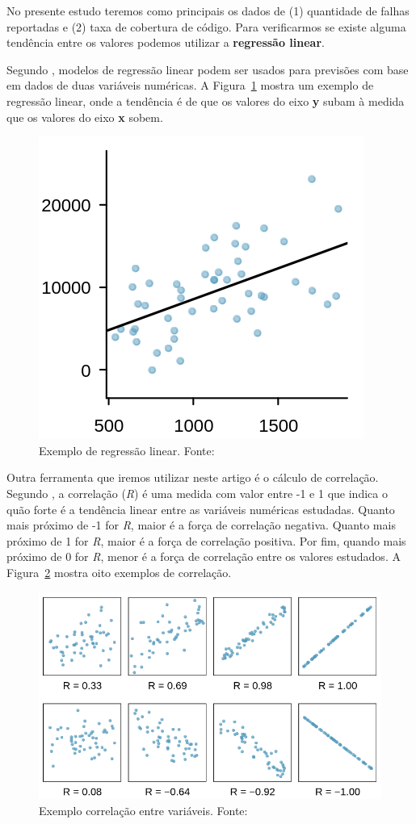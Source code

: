 \documentclass[11.5pt]{article}
\begin{document}
No presente estudo teremos como principais os dados de (1) quantidade de falhas reportadas e (2)
taxa de cobertura de código.
Para verificarmos se existe alguma tendência entre os valores podemos utilizar a
\textbf{regressão linear}.

Segundo \cite{openIntroStat}, modelos de regressão linear podem ser usados para previsões com base
em dados de duas variáveis numéricas. A Figura~\ref{fig:lin_reg_example} mostra um exemplo de
regressão linear, onde a tendência é de que os valores do eixo \textbf{y} subam à medida que os
valores do eixo \textbf{x} sobem.

\begin{figure}[ht]
    \centering
    \includegraphics[width=.3\textwidth]{lin_reg_example.png}
    \caption{Exemplo de regressão linear. Fonte: \cite{openIntroStat}}
    \label{fig:lin_reg_example}
\end{figure}

Outra ferramenta que iremos utilizar neste artigo é o cálculo de correlação.
Segundo \cite{openIntroStat}, a correlação (\textit{R}) é uma medida com valor entre -1 e 1 que
indica o quão forte é a tendência linear entre as variáveis numéricas estudadas.
Quanto mais próximo de -1 for \textit{R}, maior é a força de correlação negativa.
Quanto mais próximo de 1 for \textit{R}, maior é a força de correlação positiva.
Por fim, quando mais próximo de 0 for \textit{R}, menor é a força de correlação entre os valores
estudados. A Figura~\ref{fig:correlation_example} mostra oito exemplos de correlação.

\begin{figure}[ht]
    \centering
    \includegraphics[width=.7\textwidth]{correlation_example.png}
    \caption{Exemplo correlação entre variáveis. Fonte: \cite{openIntroStat}}
    \label{fig:correlation_example}
\end{figure}
\end{document}
